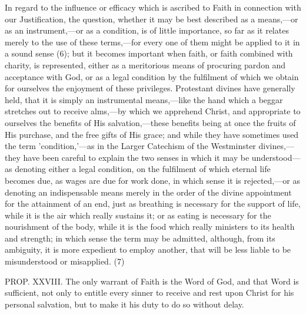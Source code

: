 \documentclass[
]{book}
\begin{document}
In regard to the influence or efficacy which is ascribed to Faith in connection with our Justification, the question, whether it may be best described as a means,---or as an instrument,---or as a condition, is of little importance, so far as it relates merely to the use of these terms,---for every one of them might be applied to it in a sound sense (6); but it becomes important when faith, or faith combined with charity, is represented, either as a meritorious means of procuring pardon and acceptance with God, or as a legal condition by the fulfilment of which we obtain for ourselves the enjoyment of these privileges. Protestant divines have generally held, that it is simply an instrumental means,---like the hand which a beggar stretches out to receive alms,---by which we apprehend Christ, and appropriate to ourselves the benefits of His salvation,---these benefits being at once the fruits of His purchase, and the free gifts of His grace; and while they have sometimes used the term 'condition,'---as in the Larger Catechism of the Westminster divines,---they have been careful to explain the two senses in which it may be understood---as denoting either a legal condition, on the fulfilment of which eternal life becomes due, as wages are due for work done, in which sense it is rejected,---or as denoting an indispensable means merely in the order of the divine appointment for the attainment of an end, just as breathing is necessary for the support of life, while it is the air which really sustains it; or as eating is necessary for the nourishment of the body, while it is the food which really ministers to its health and strength; in which sense the term may be admitted, although, from its ambiguity, it is more expedient to employ another, that will be less liable to be misunderstood or misapplied. (7)

PROP. XXVIII. The only warrant of Faith is the Word of God, and that Word is sufficient, not only to entitle every sinner to receive and rest upon Christ for his personal salvation, but to make it his duty to do so without delay.
\end{document}
